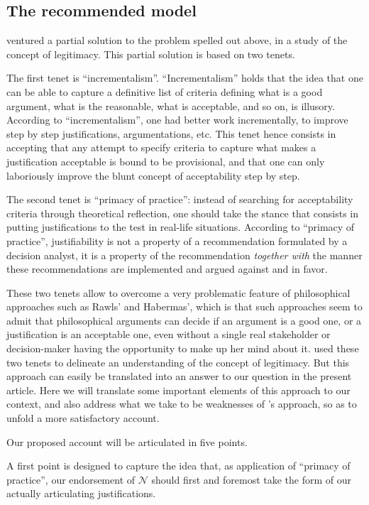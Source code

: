 \documentclass[preprint, french, english, 11pt, authoryear]{elsarticle}%
\newcommand{\adv}{\mathscr{N}}
\begin{document}
\subsection{The recommended model}
\citet{meinard_what_2017} ventured a partial solution to the problem spelled out above, in a study of the concept of legitimacy. This partial solution is based on two tenets.

The first tenet is ``incrementalism''. ``Incrementalism'' holds that the idea that one can be able to capture a definitive list of criteria defining what is a good argument, what is the reasonable, what is acceptable, and so on, is illusory. According to ``incrementalism'', one had better work incrementally, to improve step by step justifications, argumentations, etc. This tenet hence consists in accepting that any attempt to specify criteria to capture what makes a justification acceptable is bound to be provisional, and that one can only laboriously improve the blunt concept of acceptability step by step.

The second tenet is ``primacy of practice'': instead of searching for acceptability criteria through theoretical reflection, one should take the stance that consists in putting justifications to the test in real-life situations. According to ``primacy of practice'', justifiability is not a property of a recommendation formulated by a decision analyst, it is a property of the recommendation \emph{together with} the manner these recommendations are  implemented and argued against and in favor.

These two tenets allow to overcome a very problematic feature of philosophical approaches such as Rawls' and Habermas', which is that such approaches seem to admit that philosophical arguments can decide if an argument is a good one, or a justification is an acceptable one, even without a single real stakeholder or decision-maker having the opportunity to make up her mind about it. \citet{meinard_what_2017} used these two tenets to delineate an understanding of the concept of legitimacy. But this approach can easily be translated into an answer to our question in the present article. Here we will translate some important elements of this approach to our context, and also address what we take to be weaknesses of \cite{meinard_what_2017}'s approach, so as to unfold a more satisfactory account.

Our proposed account will be articulated in five points.

A first point is designed to capture the idea that, as application of ``primacy of practice'', our endorsement of $\adv$ should first and foremost take the form of our actually articulating justifications.
\end{document}
